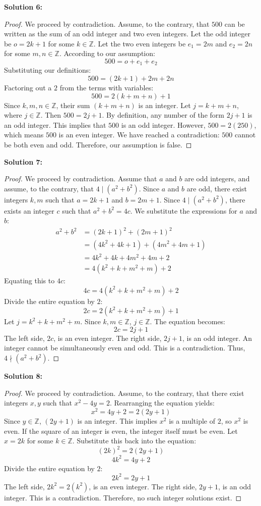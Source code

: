 \documentclass[11pt]{article}
\theoremstyle{definition}
\begin{document}
\textbf{Solution 6:}
\begin{proof}
We proceed by contradiction. Assume, to the contrary, that $500$ can be written as the sum of an odd integer and two even integers. Let the odd integer be $o = 2k + 1$ for some $k \in \mathbb{Z}$. Let the two even integers be $e_1 = 2m$ and $e_2 = 2n$ for some $m, n \in \mathbb{Z}$. According to our assumption:
\[ 500 = o + e_1 + e_2 \]
Substituting our definitions:
\[ 500 = (2k + 1) + 2m + 2n \]
Factoring out a $2$ from the terms with variables:
\[ 500 = 2(k + m + n) + 1 \]
Since $k, m, n \in \mathbb{Z}$, their sum $(k + m + n)$ is an integer. Let $j = k + m + n$, where $j \in \mathbb{Z}$. Then $500 = 2j + 1$. By definition, any number of the form $2j + 1$ is an odd integer. This implies that $500$ is an odd integer. However, $500 = 2(250)$, which means $500$ is an even integer. We have reached a contradiction: $500$ cannot be both even and odd. Therefore, our assumption is false.
\end{proof}

\textbf{Solution 7:}
\begin{proof}
We proceed by contradiction. Assume that $a$ and $b$ are odd integers, and assume, to the contrary, that $4 \mid (a^2 + b^2)$. Since $a$ and $b$ are odd, there exist integers $k, m$ such that $a = 2k + 1$ and $b = 2m + 1$. Since $4 \mid (a^2 + b^2)$, there exists an integer $c$ such that $a^2 + b^2 = 4c$. We substitute the expressions for $a$ and $b$:
\begin{align*}
a^2 + b^2 &= (2k + 1)^2 + (2m + 1)^2 \\
&= (4k^2 + 4k + 1) + (4m^2 + 4m + 1) \\
&= 4k^2 + 4k + 4m^2 + 4m + 2 \\
&= 4(k^2 + k + m^2 + m) + 2
\end{align*}
Equating this to $4c$:
\[ 4c = 4(k^2 + k + m^2 + m) + 2 \]
Divide the entire equation by $2$:
\[ 2c = 2(k^2 + k + m^2 + m) + 1 \]
Let $j = k^2 + k + m^2 + m$. Since $k, m \in \mathbb{Z}$, $j \in \mathbb{Z}$. The equation becomes:
\[ 2c = 2j + 1 \]
The left side, $2c$, is an even integer. The right side, $2j + 1$, is an odd integer. An integer cannot be simultaneously even and odd. This is a contradiction. Thus, $4 \nmid (a^2 + b^2)$.
\end{proof}

\textbf{Solution 8:}
\begin{proof}
We proceed by contradiction. Assume, to the contrary, that there exist integers $x, y$ such that $x^2 - 4y = 2$. Rearranging the equation yields:
\[ x^2 = 4y + 2 = 2(2y + 1) \]
Since $y \in \mathbb{Z}$, $(2y + 1)$ is an integer. This implies $x^2$ is a multiple of $2$, so $x^2$ is even. If the square of an integer is even, the integer itself must be even. Let $x = 2k$ for some $k \in \mathbb{Z}$. Substitute this back into the equation:
\[ (2k)^2 = 2(2y + 1) \]
\[ 4k^2 = 4y + 2 \]
Divide the entire equation by $2$:
\[ 2k^2 = 2y + 1 \]
The left side, $2k^2 = 2(k^2)$, is an even integer. The right side, $2y + 1$, is an odd integer. This is a contradiction. Therefore, no such integer solutions exist.
\end{proof}
\end{document}
